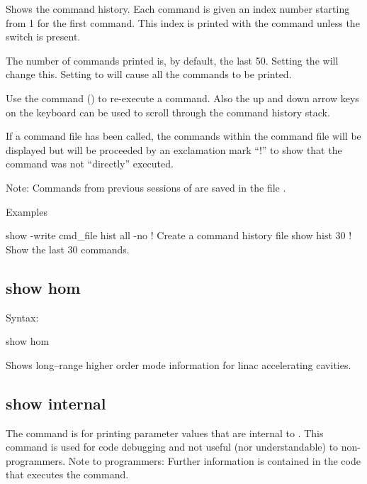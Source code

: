 {{{{{{{{Shows the command history. Each command is given an index number starting from 1 for
the first command. This index is printed with the command unless the  switch
is present.

The number of commands printed is, by default, the last 50. Setting the  will
change this. Setting  to   will cause all the commands to be printed.

Use the command  () to re-execute a command. Also the up and down
arrow keys on the keyboard can be used to scroll through the command history stack.

If a command file has been called, the commands within the command file will be displayed but will
be proceeded by an exclamation mark ``!'' to show that the command was not ``directly'' executed.

Note: Commands from previous sessions of \tao are saved in the file .

Examples
\begin{example}
  show -write cmd_file hist all -no   ! Create a command history file
  show hist 30                        ! Show the last 30 commands.
\end{example}


\subsection{show hom}
\label{s:show.hom}

Syntax:
\begin{example}
  show hom
\end{example}

Shows long--range higher order mode information for linac accelerating
cavities.


\subsection{show internal}
\label{s:show.internal}

The  command is for printing parameter values that are internal to \tao. This
command is used for code debugging and not useful (nor understandable) to non-programmers. Note to
programmers: Further information is contained in the code that executes the 
command.

}}}}}}}}
